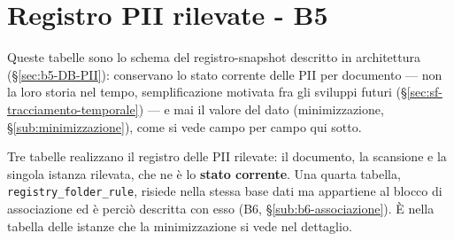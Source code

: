 \section{Registro PII rilevate - B5}
\label{sec:impl-b5}
\label{sub:dati-registro-pii}

Queste tabelle sono lo schema del registro-snapshot descritto in architettura (§\ref{sec:b5-DB-PII}): conservano lo stato corrente delle PII per documento --- non la loro storia nel tempo, semplificazione motivata fra gli sviluppi futuri (§\ref{sec:sf-tracciamento-temporale}) --- e mai il valore del dato (minimizzazione, §\ref{sub:minimizzazione}), come si vede campo per campo qui sotto.

Tre tabelle realizzano il registro delle PII rilevate: il documento, la scansione e la singola istanza rilevata, che ne è lo \textbf{stato corrente}. Una quarta tabella, \texttt{registry\_folder\_rule}, risiede nella stessa base dati ma appartiene al blocco di associazione ed è perciò descritta con esso (B6, §\ref{sub:b6-associazione}). È nella tabella delle istanze che la minimizzazione si vede nel dettaglio.

